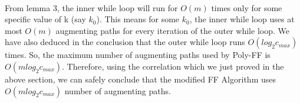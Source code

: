 \documentclass{article}
\begin{document}
\vspace{0.2cm}\\
From lemma 3, the inner while loop will run for $O(m)$ times only for some specific value of k (say $k_{0}$). This means for some $k_{0}$, the inner while loop uses at most $O(m)$ augmenting paths for every iteration of the outer while loop. We have also deduced in the conclusion that the outer while loop runs $O(log_{2}c_{max})$ times. So, the maximum number of augmenting paths used by Poly-FF is $O(mlog_{2}c_{max})$. Therefore, using the correlation which we just proved in the above section, we can safely conclude that the modified FF Algorithm uses $O(mlog_{2}c_{max})$ number of augmenting paths.


\end{document}
